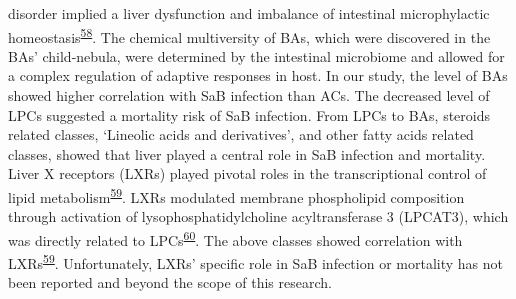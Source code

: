 \documentclass[
]{article}
\begin{document}
disorder implied a liver dysfunction and imbalance of intestinal
microphylactic
homeostasis\textsuperscript{\protect\hyperlink{ref-2021dg}{58}}. The
chemical multiversity of BAs, which were discovered in the BAs'
child-nebula, were determined by the intestinal microbiome and allowed
for a complex regulation of adaptive responses in host. In our study,
the level of BAs showed higher correlation with SaB infection than ACs.
The decreased level of LPCs suggested a mortality risk of SaB infection.
From LPCs to BAs, steroids related classes, `Lineolic acids and
derivatives', and other fatty acids related classes, showed that liver
played a central role in SaB infection and mortality. Liver X receptors
(LXRs) played pivotal roles in the transcriptional control of lipid
metabolism\textsuperscript{\protect\hyperlink{ref-2018bd}{59}}. LXRs
modulated membrane phospholipid composition through activation of
lysophosphatidylcholine acyltransferase 3 (LPCAT3), which was directly
related to LPCs\textsuperscript{\protect\hyperlink{ref-2021di}{60}}. The
above classes showed correlation with
LXRs\textsuperscript{\protect\hyperlink{ref-2018bd}{59}}. Unfortunately,
LXRs' specific role in SaB infection or mortality has not been reported
and beyond the scope of this research.
\end{document}
